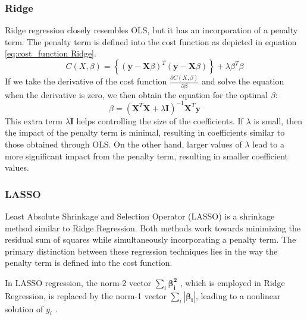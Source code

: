 \subsubsection{Ridge}
\noindent Ridge regression closely resembles OLS, but it has an incorporation of a penalty term. The penalty term is defined into the cost function as depicted in equation \eqref{eq:cost_function Ridge}.
%
\begin{equation}\label{eq:cost_function Ridge}
    C(X,\beta) =  \left\lbrace ( \textbf{y} - \textbf{X}\beta )^T (\textbf{y} - \textbf{X}\beta)\right\rbrace + \lambda \beta^T \beta
\end{equation}
%
\noindent If we take the derivative of the cost function $\frac{\partial C(X, \beta)}{\partial \beta}$ and 
solve the equation when the derivative is zero, we then obtain the equation for the optimal $\beta$:
\begin{equation}\label{eq:beta_ridge}
    \beta = (\textbf{X}^T \textbf{X} + \lambda \textbf{I})^{-1}\textbf{X}^T \textbf{y} 
\end{equation}
This extra term $\lambda \textbf{I}$ helps controlling the size of the coefficients. If $\lambda$ is small, then the impact of the penalty term is minimal, resulting in coefficients similar to those obtained through OLS. On the other hand, larger values of $\lambda$ lead to a more significant impact from the penalty term, resulting in smaller coefficient values.

\subsubsection{LASSO}
\noindent Least Absolute Shrinkage and Selection Operator (LASSO) is a shrinkage method similar to Ridge Regression. Both methods work towards minimizing the residual sum of squares while simultaneously incorporating a penalty term. The primary distinction between these regression techniques lies in the way the penalty term is defined into the cost function.

\noindent In LASSO regression, the norm-2 vector $\sum_{i} \boldsymbol{\beta_i^2}$ , which is employed in Ridge Regression, is replaced by the norm-1 vector $\sum_{i} 
|\boldsymbol{\beta_i}|$, leading to a nonlinear solution of $y_i$ \cite{SpringerCh3}.

